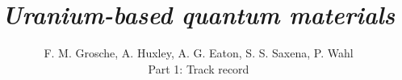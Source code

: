 \documentclass[twocolumn,prl,a4paper,tightenlines,10pt]{revtex4-2}
\begin{document}



\newcommand{\Figures}{/Users/fmg12/Documents/data/Figures}


\title {\textit{Uranium-based quantum materials}} %

\author {F. M. Grosche, A. Huxley, A. G. Eaton, S. S. Saxena, P. Wahl
\\ \vspace{0.2cm}
  Part 1: Track record}


\begin{abstract}
\vspace{-0.8cm} 
\noindent 

\end{abstract}
\setlength{\columnsep}{2em}
\fontsize{10.9pt}{12.1pt}\selectfont
\maketitle

\clearpage

\fontsize{10.87pt}{12.1pt}\selectfont
\setlength{\columnsep}{2em}

\vspace{-0.5em}


\clearpage
%
%

\end{document}
